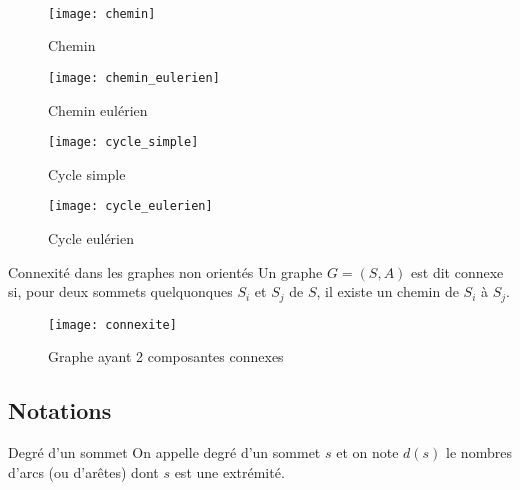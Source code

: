 \begin{exemple} ~\\
\begin{multicols}{2}
\begin{figure}[H]
\centering
\texttt{[image: chemin]}
\captionsetup{justification=centering}
\caption{Chemin}
\end{figure}

\begin{figure}[H]
\centering
\texttt{[image: chemin\_eulerien]}
\captionsetup{justification=centering}
\caption{Chemin eulérien}
\end{figure}

\begin{figure}[H]
\centering
\texttt{[image: cycle\_simple]}
\captionsetup{justification=centering}
\caption{Cycle simple}
\end{figure}

\begin{figure}[H]
\centering
\texttt{[image: cycle\_eulerien]}
\captionsetup{justification=centering}
\caption{Cycle eulérien}
\end{figure}
\end{multicols}
\end{exemple}


%



\begin{defi}{Connexité dans les graphes non orientés}
Un graphe $G=(S,A)$ est dit connexe si, pour deux sommets quelquonques $S_i$ et $S_j$ de $S$, il existe un chemin de $S_i$ à $S_j$.
\end{defi}

\begin{exemple}
\begin{figure}[H]
\centering
\texttt{[image: connexite]}
\captionsetup{justification=centering}
\caption{Graphe ayant 2 composantes connexes}
\end{figure}
\end{exemple}

\subsection{Notations}
\begin{defi}{Degré d'un sommet}
On appelle degré d'un sommet $s$ et on note $d\left(s\right)$ le nombres d'arcs (ou d'arêtes) dont $s$ est une extrémité.
\end{defi}

